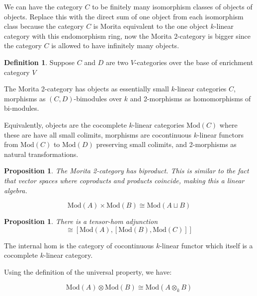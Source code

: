 \documentclass[10pt]{article}
\theoremstyle{plain}%
\newtheorem{proposition}[theorem]{Proposition}
\theoremstyle{definition}
\newtheorem{definition}{Definition}[section]
\theoremstyle{remark}
\begin{document}
We can have the category $C$ to be finitely many isomorphism classes of objects of objects. Replace this with the direct sum of one object from each isomorphism class because the category $C$ is Morita equivalent to the one object $k$-linear category with this endomorphism ring, now the Morita $2$-category is bigger since the category $C$ is allowed to have infinitely many objects.

\begin{definition}
	Suppose $C$ and $D$ are two $V$-categories over the base of enrichment category $V$

	The Morita 2-category has objects as essentially small $k$-linear categories $C$, morphisms as $(C,D)$-bimodules over $k$ and 2-morphisms as homomorphisms of bi-modules.

	Equivalently, objects are the cocomplete $k$-linear categories $\mathrm{Mod}(C)$ where these are have all small colimits, morphisms are cocontinuous $k$-linear functors from $\mathrm{Mod}(C)$ to $\mathrm{Mod}(D)$ preserving small colimits, and 2-morphisms as natural transformations.
\end{definition}

\begin{proposition}
	The Morita 2-category has biproduct.
	This is similar to the fact that vector spaces where coproducts and products coincide, making this a linear algebra.

	\begin{equation}
		\mathrm{Mod}(A) \times \mathrm{Mod}(B)
		\cong \mathrm{Mod}(A \sqcup B)
	\end{equation}
\end{proposition}

\begin{proposition}
	There is a tensor-hom adjunction
	\begin{equation}
		[\mathrm{Mod}(A) \otimes \mathrm{Mod}(B), \mathrm{Mod}(C)]
		\cong
		[\mathrm{Mod}(A), [\mathrm{Mod}(B), \mathrm{Mod}(C)]]
	\end{equation}
\end{proposition}

The internal hom is the category of cocontinuous $k$-linear functor which itself is a cocomplete $k$-linear category.

Using the definition of the universal property, we have:

\begin{equation}
	\mathrm{Mod}(A) \otimes \mathrm{Mod}(B) \cong \mathrm{Mod}(A \otimes_k B)
\end{equation}
\end{document}
